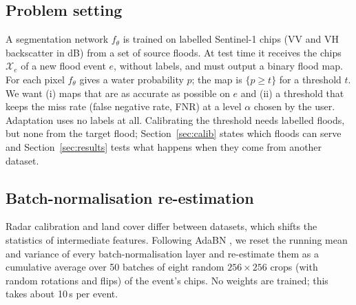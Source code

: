 \documentclass[a4paper,fleqn]{cas-sc}
\begin{document}
\subsection{Problem setting}
A segmentation network $f_\theta$ is trained on labelled Sentinel-1 chips (VV and VH backscatter in dB) from a set of source floods. At test time it receives the chips $\mathcal{X}_e$ of a new flood event $e$, without labels, and must output a binary flood map. For each pixel $f_\theta$ gives a water probability $p$; the map is $\{p \ge t\}$ for a threshold $t$. We want (i) maps that are as accurate as possible on $e$ and (ii) a threshold that keeps the miss rate (false negative rate, FNR) at a level $\alpha$ chosen by the user. Adaptation uses no labels at all. Calibrating the threshold needs labelled floods, but none from the target flood; Section~\ref{sec:calib} states which floods can serve and Section~\ref{sec:results} tests what happens when they come from another dataset.

\subsection{Batch-normalisation re-estimation}
Radar calibration and land cover differ between datasets, which shifts the statistics of intermediate features. Following AdaBN \citep{li2018adabn}, we reset the running mean and variance of every batch-normalisation layer and re-estimate them as a cumulative average over 50 batches of eight random $256\times256$ crops (with random rotations and flips) of the event's chips. No weights are trained; this takes about 10\,s per event.
\end{document}
